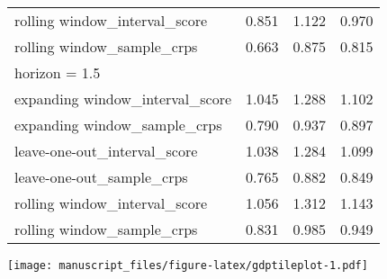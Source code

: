 \documentclass[
]{article}
\begin{document}
\begin{longtable}{l|rrr}
rolling window\_interval\_score & 0.851 & 1.122 & 0.970 \\ 
rolling window\_sample\_crps & 0.663 & 0.875 & 0.815 \\ 
\midrule
\multicolumn{4}{l}{horizon = 1.5} \\ 
\midrule
expanding window\_interval\_score & 1.045 & 1.288 & 1.102 \\ 
expanding window\_sample\_crps & 0.790 & 0.937 & 0.897 \\ 
leave-one-out\_interval\_score & 1.038 & 1.284 & 1.099 \\ 
leave-one-out\_sample\_crps & 0.765 & 0.882 & 0.849 \\ 
rolling window\_interval\_score & 1.056 & 1.312 & 1.143 \\ 
rolling window\_sample\_crps & 0.831 & 0.985 & 0.949 \\ 
\bottomrule
\end{longtable}

\texttt{[image: manuscript\_files/figure-latex/gdptileplot-1.pdf]}
\end{document}
